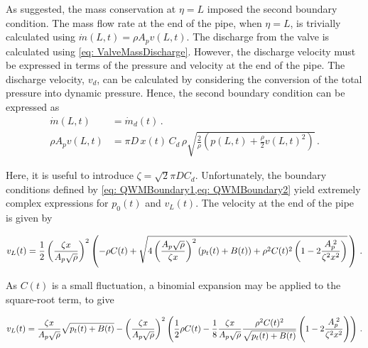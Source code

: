 As suggested, the mass conservation at $\eta = L$ imposed the second boundary condition. The mass flow rate at the end of the pipe, when $\eta=L$, is trivially calculated using $\dot{m}(L,t) = \rho A_p v(L,t)$. The discharge from the valve is calculated using \cref{eq: ValveMassDischarge}. However, the discharge velocity must be expressed in terms of the pressure and velocity at the end of the pipe. The discharge velocity, $v_d$, can be calculated by considering the conversion of the total pressure into dynamic pressure. Hence, the second boundary condition can be expressed as
~
\begin{equation} \label{eq: QWMBoundary2}
\begin{split}
    \dot{m}(L,t) &= \dot{m}_d(t) \, . \\
    \rho A_p v(L,t) &= \pi D \, x(t) \, C_d \, \rho \sqrt{\frac{2}{\rho} \left( p(L,t) + \frac{\rho}{2} v(L,t)^2 \right)} \, .
\end{split}
\end{equation}

Here, it is useful to introduce $\zeta = \sqrt{2} \pi D C_d$. Unfortunately, the boundary conditions defined by \cref{eq: QWMBoundary1,eq: QWMBoundary2} yield extremely complex expressions for $p_0(t)$ and $v_L(t)$. The velocity at the end of the pipe is given by

\begin{equation*}
    v_L(t) = \frac{1}{2} \left( \frac{\zeta x}{A_p \sqrt{\rho}} \right)^2 \left( - \rho C(t) + \sqrt{4 \left( \frac{A_p \sqrt{\rho}}{\zeta x} \right)^2 \left( p_t(t) + B(t) \right) + \rho^2 C(t)^2 \left( 1 - 2 \frac{A_p^{\;2}}{\zeta^2 x^2} \right)} \, \right) \, .
\end{equation*}

As $C(t)$ is a small fluctuation, a binomial expansion may be applied to the square-root term, to give

\begin{equation*}
    v_L(t) = \frac{\zeta x}{A_p \sqrt{\rho}} \sqrt{p_t(t) + B(t)} - 
    \left( \frac{\zeta x}{A_p \sqrt{\rho}} \right)^2 \left( \frac{1}{2} \rho C(t) - \frac{1}{8} \frac{\zeta x}{A_p \sqrt{\rho}} \frac{\rho^2 C(t)^2}{\sqrt{p_t(t) + B(t)}} \left( 1 - 2 \frac{A_p^{\;2}}{\zeta^2 x^2} \right) \right) \, .
\end{equation*}

